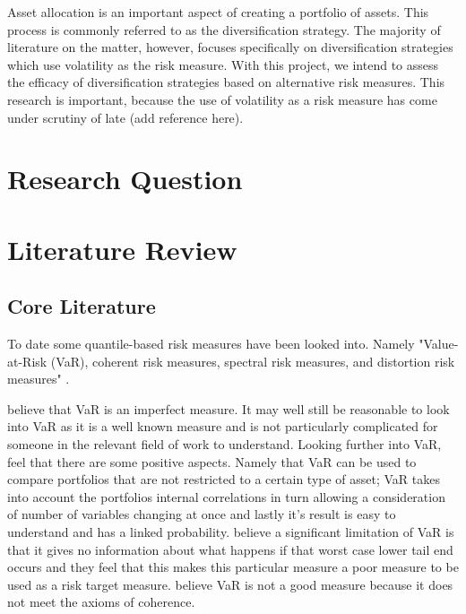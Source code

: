 \documentclass[12pt,a4paper]{article}
\begin{document}
Asset allocation is an important aspect of creating a portfolio of assets. This process is commonly referred to as the diversification strategy. The majority of literature on the matter, however, focuses specifically on diversification strategies which use volatility as the risk measure. With this project, we intend to assess the efficacy of diversification strategies based on alternative risk measures.
This research is important, because the use of volatility as a risk measure has come under scrutiny of late (add reference here).




\section{Research Question}
\label{sec:ResQues}


\section{Literature Review}
\label{sec:LitRev}

\subsection{Core Literature}
\label{subsec:CorLit}

To date some quantile-based risk measures have been looked into. Namely "Value-at-Risk (VaR), coherent risk measures, spectral risk measures, and distortion risk measures" \citep{dowd2006after}.

\cite{dowd2006after} believe that VaR is an imperfect measure. It may well still be reasonable to look into VaR as it is a well known measure and is not particularly complicated for someone in the relevant field of work to understand. Looking further into VaR, \cite{dowd2006after} feel that there are some positive aspects. Namely that VaR can be used to compare portfolios that are not restricted to a certain type of asset; VaR takes into account the portfolios internal correlations in turn allowing a consideration of number of variables changing at once and lastly it's result is easy to understand and has a linked probability.  \cite{dowd2006after} believe a significant limitation of VaR is that it gives no information about what happens if that worst case lower tail end occurs and they feel that this makes this particular measure a poor measure to be used as a risk target measure. \cite{ACERBI20021505} believe VaR is not a good measure because it does not meet the axioms of coherence.
\end{document}
